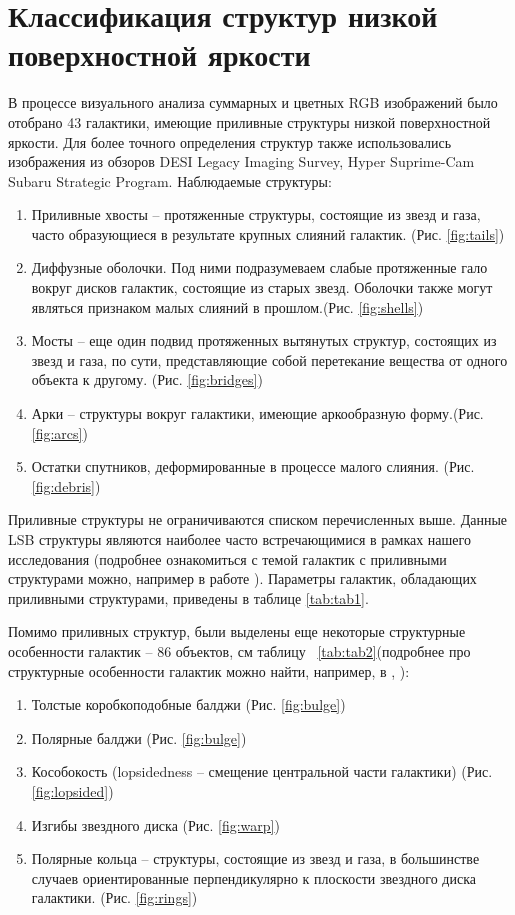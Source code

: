 \section{Классификация структур низкой поверхностной яркости}
В процессе визуального анализа суммарных и цветных RGB изображений было отобрано 43 галактики, имеющие приливные структуры низкой поверхностной яркости. Для более точного определения структур также использовались изображения из обзоров DESI Legacy Imaging Survey\cite{2019AJ....157..168D}, Hyper Suprime-Cam Subaru Strategic Program\cite{2022PASJ...74..247A}. 
Наблюдаемые структуры:
\begin{enumerate}
    \item Приливные хвосты -- протяженные структуры, состоящие из звезд и газа, часто образующиеся в результате крупных слияний галактик. (Рис. \ref{fig:tails})
    \item Диффузные оболочки. Под ними подразумеваем слабые протяженные гало вокруг дисков галактик, состоящие из старых звезд. Оболочки также могут являться признаком малых слияний в прошлом.(Рис. \ref{fig:shells})
    \item Мосты -- еще один подвид протяженных вытянутых структур, состоящих из звезд и газа, по сути, представляющие собой перетекание вещества от одного объекта к другому. (Рис. \ref{fig:bridges})
    \item Арки -- структуры вокруг галактики, имеющие аркообразную форму.(Рис.  \ref{fig:arcs})
    \item Остатки спутников, деформированные в процессе малого слияния. (Рис. \ref{fig:debris})
\end{enumerate}
Приливные структуры не ограничиваются списком перечисленных выше. Данные LSB структуры являются наиболее часто встречающимися в рамках нашего исследования (подробнее ознакомиться с темой галактик с приливными структурами можно, например в работе \citep{2019MNRAS.483.1470R}). Параметры галактик, обладающих приливными структурами, приведены в таблице \ref{tab:tab1}.


Помимо приливных структур, были выделены еще некоторые структурные особенности галактик -- 86 объектов, см таблицу ~\ref{tab:tab2}(подробнее про структурные особенности галактик можно найти, например, в  \citep{van_der_Kruit_2011}, \citep{2020MNRAS.497.2039M}):
\begin{enumerate}
    \item Толстые коробкоподобные балджи (Рис. \ref{fig:bulge})
    \item Полярные балджи (Рис. \ref{fig:bulge})
    \item Кособокость (lopsidedness -- смещение центральной части галактики) (Рис. \ref{fig:lopsided})
    \item Изгибы звездного диска (Рис. \ref{fig:warp})
    \item Полярные кольца -- структуры, состоящие из звезд и газа, в большинстве случаев ориентированные перпендикулярно к плоскости звездного диска галактики. (Рис. \ref{fig:rings}) 
\end{enumerate}

